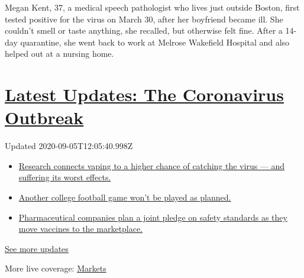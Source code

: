 Megan Kent, 37, a medical speech pathologist who lives just outside
Boston, first tested positive for the virus on March 30, after her
boyfriend became ill. She couldn't smell or taste anything, she
recalled, but otherwise felt fine. After a 14-day quarantine, she went
back to work at Melrose Wakefield Hospital and also helped out at a
nursing home.

\hypertarget{latest-updates-the-coronavirus-outbreak}{%
\section{\texorpdfstring{\href{https://www.nytimes3xbfgragh.onion/2020/09/04/world/covid-19-coronavirus.html?action=click\&pgtype=Article\&state=default\&region=MAIN_CONTENT_1\&context=storylines_live_updates}{Latest
Updates: The Coronavirus
Outbreak}}{Latest Updates: The Coronavirus Outbreak}}\label{latest-updates-the-coronavirus-outbreak}}

Updated 2020-09-05T12:05:40.998Z

\begin{itemize}
\tightlist
\item
  \href{https://www.nytimes3xbfgragh.onion/2020/09/04/world/covid-19-coronavirus.html?action=click\&pgtype=Article\&state=default\&region=MAIN_CONTENT_1\&context=storylines_live_updates\#link-1654f6ad}{Research
  connects vaping to a higher chance of catching the virus --- and
  suffering its worst effects.}
\item
  \href{https://www.nytimes3xbfgragh.onion/2020/09/04/world/covid-19-coronavirus.html?action=click\&pgtype=Article\&state=default\&region=MAIN_CONTENT_1\&context=storylines_live_updates\#link-52e4198a}{Another
  college football game won't be played as planned.}
\item
  \href{https://www.nytimes3xbfgragh.onion/2020/09/04/world/covid-19-coronavirus.html?action=click\&pgtype=Article\&state=default\&region=MAIN_CONTENT_1\&context=storylines_live_updates\#link-181cef0}{Pharmaceutical
  companies plan a joint pledge on safety standards as they move
  vaccines to the marketplace.}
\end{itemize}

\href{https://www.nytimes3xbfgragh.onion/2020/09/04/world/covid-19-coronavirus.html?action=click\&pgtype=Article\&state=default\&region=MAIN_CONTENT_1\&context=storylines_live_updates}{See
more updates}

More live coverage:
\href{https://www.nytimes3xbfgragh.onion/live/2020/09/04/business/stock-market-today-coronavirus?action=click\&pgtype=Article\&state=default\&region=MAIN_CONTENT_1\&context=storylines_live_updates}{Markets}

